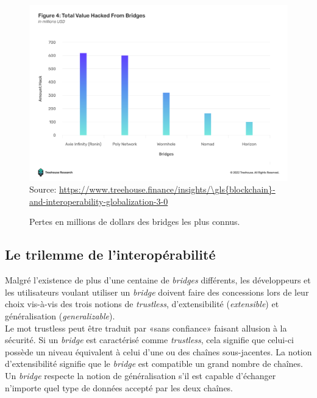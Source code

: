 \begin{figure}[h!]
    \centering
\includegraphics[scale=0.30]{centralisation/imagesBridges/GraphLossesBridges.png}
    {\scriptsize
            Source: \url{https://www.treehouse.finance/insights/\gls{blockchain}-and-interoperability-globalization-3-0}}
    \caption{Pertes en millions de dollars des bridges les plus connus.}
    \label{fig:GraphBridges}
\end{figure}

\subsection{Le trilemme de l’interopérabilité}

Malgré l’existence de plus d’une centaine de \textit{bridges} différents, les développeurs et les utilisateurs voulant utiliser un \textit{bridge} doivent faire des concessions lors de leur choix vis-à-vis des trois notions de \textit{trustless}, d’extensibilité (\textit{extensible}) et généralisation (\textit{generalizable}).\\

Le mot trustless peut être traduit par «sans confiance» faisant allusion à la sécurité. Si un \textit{bridge} est caractérisé comme \textit{trustless}, cela signifie que celui-ci possède un niveau équivalent à celui d’une ou des chaînes sous-jacentes.  La notion  d’extensibilité signifie que le \textit{bridge} est compatible un grand nombre de chaînes.
Un \textit{bridge} respecte la notion de généralisation s’il est capable d'échanger n’importe quel type de données accepté par les deux chaînes.\\

